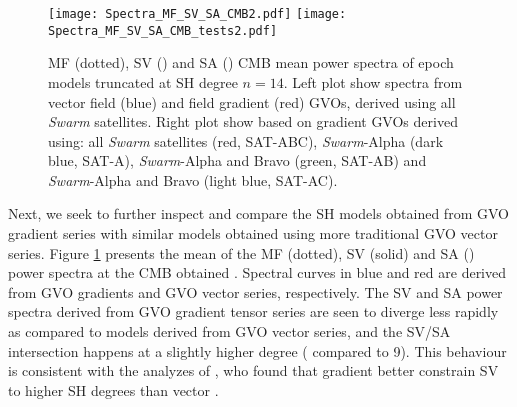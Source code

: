 \documentclass[extra,mreferee]{gji}
\begin{document}
\begin{figure}
\centerline{\texttt{[image: Spectra\_MF\_SV\_SA\_CMB2.pdf]} \texttt{[image: Spectra\_MF\_SV\_SA\_CMB\_tests2.pdf]}}
\caption{MF (dotted), SV () and SA () CMB mean power spectra of epoch models truncated at SH degree $n=14$. Left plot show spectra from vector field (blue) and field gradient (red) GVOs, derived using all {\it Swarm} satellites. Right plot show  based on gradient GVOs derived using: all {\it Swarm} satellites (red, SAT-ABC), {\it Swarm}-Alpha (dark blue, SAT-A), {\it Swarm}-Alpha and Bravo (green, SAT-AB) and {\it Swarm}-Alpha and Bravo (light blue, SAT-AC).}
\label{Fig:12}	
\end{figure} 
Next, we seek to further inspect and compare the SH models obtained from GVO gradient series with similar models obtained using more traditional GVO vector  series. Figure \ref{Fig:12} presents the mean of the MF (dotted), SV (solid) and SA ()  power spectra  at the  \added{(}CMB\added{)} obtained . Spectral curves in blue and red are derived from GVO gradients and GVO vector series, respectively. The SV and SA power spectra derived from GVO gradient tensor series are seen to diverge less rapidly as compared to models derived from GVO vector series, and the SV/SA intersection happens at a slightly higher degree ( compared to 9). This behaviour is consistent with the analyzes of \cite{kotsiaros_Olsen_2014}, who found that gradient  better constrain SV to higher SH degrees than vector .  
\end{document}
